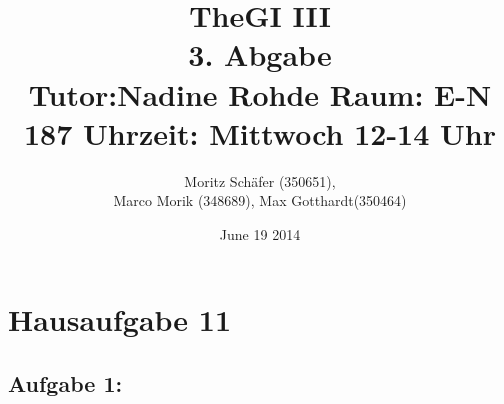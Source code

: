 \documentclass[10pt,a4paper,german,landscape,fleqn]{article} \usepackage[utf8]{inputenc} %
\begin{document}
\title{TheGI III \\
3. Abgabe\\
Tutor:Nadine Rohde Raum: E-N 187 Uhrzeit: Mittwoch 12-14 Uhr \\ } %
\author{Moritz Schäfer (350651), \\
Marco Morik (348689), Max Gotthardt(350464)} %
\date{June 19 2014} %

\maketitle



\newpage
\section*{Hausaufgabe 11}
\subsection*{Aufgabe 1:}
\end{document}
